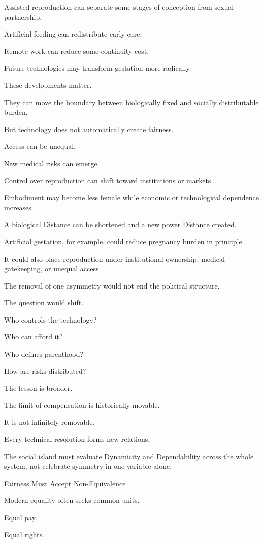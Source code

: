 Assisted reproduction can separate some stages of conception from sexual partnership.

Artificial feeding can redistribute early care.

Remote work can reduce some continuity cost.

Future technologies may transform gestation more radically.

These developments matter.

They can move the boundary between biologically fixed and socially distributable burden.

But technology does not automatically create fairness.

Access can be unequal.

New medical risks can emerge.

Control over reproduction can shift toward institutions or markets.

Embodiment may become less female while economic or technological dependence increases.

A biological Distance can be shortened and a new power Distance created.

Artificial gestation, for example, could reduce pregnancy burden in principle.

It could also place reproduction under institutional ownership, medical gatekeeping, or unequal access.

The removal of one asymmetry would not end the political structure.

The question would shift.

Who controls the technology?

Who can afford it?

Who defines parenthood?

How are risks distributed?

The lesson is broader.

The limit of compensation is historically movable.

It is not infinitely removable.

Every technical resolution forms new relations.

The social island must evaluate Dynamicity and Dependability across the whole system, not celebrate symmetry in one variable alone.

Fairness Must Accept Non-Equivalence

Modern equality often seeks common units.

Equal pay.

Equal rights.

